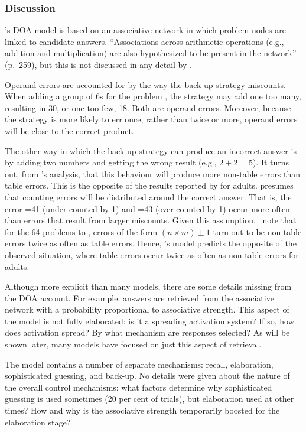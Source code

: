\subsubsection{Discussion}

\citeauthor{siegmult}'s DOA model is based on an associative network in
which problem nodes are linked to candidate answers. ``Associations across
arithmetic operations (e.g., addition and multiplication) are also
hypothesized to be present in the network'' (p.~259), but this is not
discussed in any detail by \citeauthor{siegmult}.

Operand errors are accounted for by the way the back-up strategy
miscounts.  When adding a group of 6s for the problem , the strategy
may add one too many, resulting in 30, or one too few, 18.  Both are
operand errors.  Moreover, because the strategy is more likely to err
once, rather than twice or more, operand errors will be close to the
correct product.

The other way in which the back-up strategy can produce an incorrect answer
is by adding two numbers and getting the wrong result (e.g., $2+2=5$).  It
turns out, from \citeauthor{mcclmode}'s \citeyear{mcclmode} analysis,
that this behaviour will
produce more non-table errors than table errors.  This is the opposite of
the results reported by  for adults.
\citeauthor{siegmult} presumes
that counting errors will be distributed around the correct answer. That
is, the error =41 (under counted by 1) and =43 (over counted by 1)
occur more often than errors that result from larger miscounts. Given this
assumption, \citeauthor{mcclmode}\ note that for the 64 problems  to
, errors of the form $(n\times m)\pm1$ turn out to be non-table errors
twice as often as table errors. Hence, \citeauthor{siegmult}'s model
predicts the opposite of the observed situation, where table errors occur
twice as often as non-table errors for adults.

Although more explicit than many models, there are some details missing from
the DOA account.  For example, answers are retrieved from the associative
network with a probability proportional to associative strength.  This
aspect of the model is not fully elaborated: is it a spreading activation
system? If so, how does activation spread? By what mechanism are responses
selected? As will be shown later, many models have focused on just this
aspect of retrieval.

The model contains a number of separate mechanisms: recall, elaboration,
sophisticated guessing, and back-up.  No details were given about the
nature of the overall control mechanisms: what factors determine why
sophisticated guessing is used sometimes (20 per cent of trials), but
elaboration used at other times?  How and why is the associative strength
temporarily boosted for the elaboration stage?

